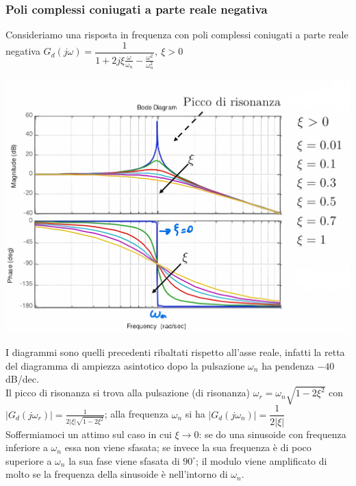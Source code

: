 \documentclass{article}
\numberwithin{equation}{subsection}
\begin{document}
\subsubsection{Poli complessi coniugati a parte reale negativa}
Consideriamo una risposta in frequenza con poli complessi coniugati a parte reale negativa
$G_d(j\omega) = \dfrac{1}{1+2j \xi \frac{\omega}{\omega_n}-\frac{\omega^2}{\omega_n^2}}, \ \xi > 0$
\begin{center}
    \includegraphics[scale=0.15]{Images/Diagramma_poli_cc_neg_1.png}
\end{center}
I diagrammi sono quelli precedenti ribaltati rispetto all'asse reale, infatti la retta del diagramma di ampiezza asintotico dopo la pulsazione $\omega_n$ ha pendenza $-40$ dB/dec.\\
Il picco di risonanza si trova alla pulsazione (di risonanza) $\omega_r = \omega_n \sqrt{1-2\xi^2}$ con $|G_d(j\omega_r)| = \frac{1}{2|\xi|\sqrt{1-2\xi^2}}$; alla frequenza $\omega_n$ si ha $|G_d(j\omega_n)| = \dfrac{1}{2|\xi|}$
\vspace*{0.2cm}\\
Soffermiamoci un attimo sul caso in cui $\xi \rightarrow 0$: se do una sinusoide con frequenza inferiore a $\omega_n$ essa non viene sfasata; se invece la sua frequenza è di poco superiore a $\omega_n$ la sua fase viene sfasata di $90^\circ$; il modulo viene amplificato di molto se la frequenza della sinusoide è nell'intorno di $\omega_n$.
\end{document}
